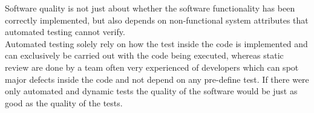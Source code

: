 \begin{parlist}
Software quality is not just about whether the software functionality has been correctly implemented, but also depends on non-functional system attributes that automated testing cannot verify.\\

Automated testing solely rely on how the test inside the code is implemented and can exclusively be carried out with the code being executed, whereas static review are done by a team often very experienced of developers which can spot major defects inside the code and not depend on any pre-define test. If there were only automated and dynamic tests the quality of the software would be just as good as the quality of the tests.
\end{parlist}
